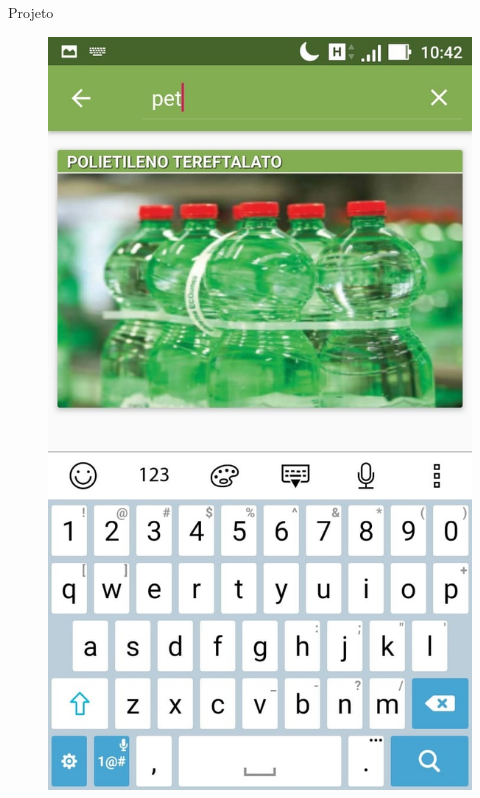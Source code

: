 \documentclass[
	12pt,				%
	openright,			%
	twoside,			%
	a4paper,			%
	english,			%
	french,				%
	spanish,			%
	brazil				%
	]{abntex2}
\begin{document}
\begin{chapter}{Projeto}
\begin{figure}[htb]
\begin{minipage}{0.45\textwidth}
    \includegraphics[scale=0.35]{media/tela_material_act_2.jpg}
     \label{fig:tela_material_act_2}
  \end{minipage}
\end{figure}



\end{chapter}
\end{document}
